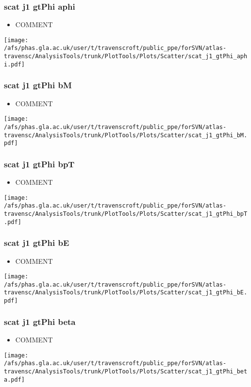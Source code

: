 \documentclass{beamer}
\begin{document}
\begin{frame}
\frametitle{scat j1 gtPhi aphi}
\begin{itemize}
\item COMMENT
\end{itemize}
\begin{center}
\texttt{[image: /afs/phas.gla.ac.uk/user/t/travenscroft/public\_ppe/forSVN/atlas-travensc/AnalysisTools/trunk/PlotTools/Plots/Scatter/scat\_j1\_gtPhi\_aphi.pdf]}
\end{center}
\end{frame}

\begin{frame}
\frametitle{scat j1 gtPhi bM}
\begin{itemize}
\item COMMENT
\end{itemize}
\begin{center}
\texttt{[image: /afs/phas.gla.ac.uk/user/t/travenscroft/public\_ppe/forSVN/atlas-travensc/AnalysisTools/trunk/PlotTools/Plots/Scatter/scat\_j1\_gtPhi\_bM.pdf]}
\end{center}
\end{frame}

\begin{frame}
\frametitle{scat j1 gtPhi bpT}
\begin{itemize}
\item COMMENT
\end{itemize}
\begin{center}
\texttt{[image: /afs/phas.gla.ac.uk/user/t/travenscroft/public\_ppe/forSVN/atlas-travensc/AnalysisTools/trunk/PlotTools/Plots/Scatter/scat\_j1\_gtPhi\_bpT.pdf]}
\end{center}
\end{frame}

\begin{frame}
\frametitle{scat j1 gtPhi bE}
\begin{itemize}
\item COMMENT
\end{itemize}
\begin{center}
\texttt{[image: /afs/phas.gla.ac.uk/user/t/travenscroft/public\_ppe/forSVN/atlas-travensc/AnalysisTools/trunk/PlotTools/Plots/Scatter/scat\_j1\_gtPhi\_bE.pdf]}
\end{center}
\end{frame}

\begin{frame}
\frametitle{scat j1 gtPhi beta}
\begin{itemize}
\item COMMENT
\end{itemize}
\begin{center}
\texttt{[image: /afs/phas.gla.ac.uk/user/t/travenscroft/public\_ppe/forSVN/atlas-travensc/AnalysisTools/trunk/PlotTools/Plots/Scatter/scat\_j1\_gtPhi\_beta.pdf]}
\end{center}
\end{frame}
\end{document}
